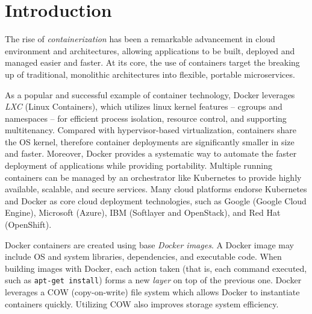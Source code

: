 \section{Introduction}
 \label{sec:intro}

\vspace{-2pt}



The rise of \emph{containerization} has been a remarkable advancement in 
cloud environment and architectures,
allowing applications to be built, deployed and managed easier and faster.
At its core, the use of containers target the breaking up of traditional, monolithic architectures into flexible, portable microservices. 

As a popular and successful example of container technology,
Docker leverages \emph{LXC} (Linux Containers), which utilizes linux kernel features -- 
cgroups and namespaces -- for 
efficient process isolation, resource control, and supporting multitenancy.
Compared with hypervisor-based virtualization,
containers share the OS kernel,
therefore container deployments are significantly smaller in size and faster.
Moreover, Docker provides a systematic way to automate the faster deployment of applications while providing portability. Multiple running containers can be managed by an orchestrator like Kubernetes to provide highly available, scalable, and secure services.
Many cloud platforms endorse Kubernetes and Docker 
as core cloud deployment technologies,
such as Google (Google Cloud Engine),
Microsoft (Azure),
IBM (Softlayer and OpenStack),
 and
Red Hat (OpenShift).
 
Docker containers are created using base \emph{Docker images}. 
A Docker image may include OS and system libraries, dependencies, and executable code. 
When building images with Docker, 
each action taken (that is, each command executed, such as \texttt{apt-get install}) forms a new \emph{layer} on top of the previous one. 
Docker leverages a COW (copy-on-write) file system 
which allows Docker to instantiate containers quickly. 
Utilizing COW also improves storage system efficiency. 

